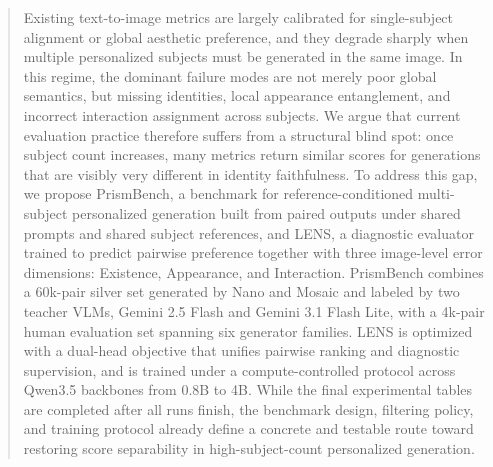\begin{abstract}
Existing text-to-image metrics are largely calibrated for single-subject alignment or global aesthetic preference, and they degrade sharply when multiple personalized subjects must be generated in the same image. In this regime, the dominant failure modes are not merely poor global semantics, but missing identities, local appearance entanglement, and incorrect interaction assignment across subjects. We argue that current evaluation practice therefore suffers from a structural blind spot: once subject count increases, many metrics return similar scores for generations that are visibly very different in identity faithfulness. To address this gap, we propose PrismBench, a benchmark for reference-conditioned multi-subject personalized generation built from paired outputs under shared prompts and shared subject references, and LENS, a diagnostic evaluator trained to predict pairwise preference together with three image-level error dimensions: Existence, Appearance, and Interaction. PrismBench combines a 60k-pair silver set generated by Nano and Mosaic and labeled by two teacher VLMs, Gemini 2.5 Flash and Gemini 3.1 Flash Lite, with a 4k-pair human evaluation set spanning six generator families. LENS is optimized with a dual-head objective that unifies pairwise ranking and diagnostic supervision, and is trained under a compute-controlled protocol across Qwen3.5 backbones from 0.8B to 4B. While the final experimental tables are completed after all runs finish, the benchmark design, filtering policy, and training protocol already define a concrete and testable route toward restoring score separability in high-subject-count personalized generation.
\end{abstract}
